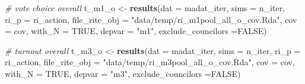 \documentclass[]{article}
\newenvironment{Shaded}{\begin{snugshade}}{\end{snugshade}}
\newcommand{\KeywordTok}[1]{\textcolor[rgb]{0.13,0.29,0.53}{\textbf{#1}}}
\newcommand{\DataTypeTok}[1]{\textcolor[rgb]{0.13,0.29,0.53}{#1}}
\newcommand{\StringTok}[1]{\textcolor[rgb]{0.31,0.60,0.02}{#1}}
\newcommand{\CommentTok}[1]{\textcolor[rgb]{0.56,0.35,0.01}{\textit{#1}}}
\newcommand{\OtherTok}[1]{\textcolor[rgb]{0.56,0.35,0.01}{#1}}
\newcommand{\NormalTok}[1]{#1}
\begin{document}
\begin{Shaded}
\begin{Highlighting}[]
\CommentTok{# vote choice overall}
\NormalTok{t_m1_o <-}\StringTok{ }\KeywordTok{results}\NormalTok{(}\DataTypeTok{dat =}\NormalTok{ madat_iter, }\DataTypeTok{sims =}\NormalTok{ n_iter, }\DataTypeTok{ri_p =}\NormalTok{ ri_action, }\DataTypeTok{file_rite_obj =} \StringTok{"data/temp/ri_m1pool_all_o_cov.Rda"}\NormalTok{,}
                  \DataTypeTok{cov =}\NormalTok{ cov, }\DataTypeTok{with_N =} \OtherTok{TRUE}\NormalTok{, }\DataTypeTok{depvar =} \StringTok{"m1"}\NormalTok{, }\DataTypeTok{exclude_councilors =}\OtherTok{FALSE}\NormalTok{)}

\CommentTok{# turnout overall}
\NormalTok{t_m3_o <-}\StringTok{ }\KeywordTok{results}\NormalTok{(}\DataTypeTok{dat =}\NormalTok{ madat_iter, }\DataTypeTok{sims =}\NormalTok{ n_iter, }\DataTypeTok{ri_p =}\NormalTok{ ri_action, }\DataTypeTok{file_rite_obj =} \StringTok{"data/temp/ri_m3pool_all_o_cov.Rda"}\NormalTok{,}
                  \DataTypeTok{cov =}\NormalTok{ cov, }\DataTypeTok{with_N =} \OtherTok{TRUE}\NormalTok{, }\DataTypeTok{depvar =} \StringTok{"m3"}\NormalTok{, }\DataTypeTok{exclude_councilors =}\OtherTok{FALSE}\NormalTok{)}
\end{Highlighting}
\end{Shaded}
\end{document}
